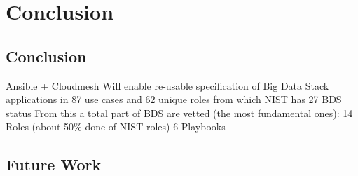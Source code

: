 \section{Conclusion}\label{S:conclusion}


\subsection{Conclusion}
Ansible + Cloudmesh
Will enable re-usable specification of Big Data Stack applications in 87 use cases and 62 unique roles from which NIST has 27
BDS status
From this a total part of BDS are vetted (the most fundamental ones): 
14 Roles  (about 50\% done of NIST roles)
6   Playbooks



\subsection{Future Work}



